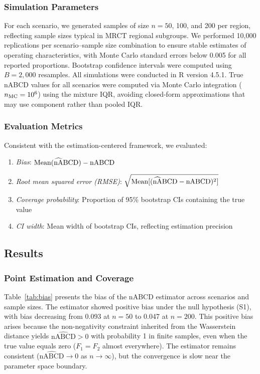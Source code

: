 \documentclass[AMA,Times1COL]{WileyNJDv5}
\newcommand{\hnABCD}{\mathrlap{\widehat{\phantom{\text{nA}}}}\text{nABCD}}
\begin{document}
\subsubsection{Simulation Parameters}

For each scenario, we generated samples of size $n = 50$, 100, and 200 per region, reflecting sample sizes typical in MRCT regional subgroups. We performed 10{,}000 replications per scenario--sample size combination to ensure stable estimates of operating characteristics, with Monte Carlo standard errors below 0.005 for all reported proportions. Bootstrap confidence intervals were computed using $B = 2{,}000$ resamples. All simulations were conducted in R version 4.5.1. True nABCD values for all scenarios were computed via Monte Carlo integration ($n_{\textup{MC}} = 10^6$) using the mixture IQR, avoiding closed-form approximations that may use component rather than pooled IQR.

\subsubsection{Evaluation Metrics}

Consistent with the estimation-centered framework, we evaluated:
\begin{enumerate}[1.]
\item \emph{Bias}: $\text{Mean}(\hnABCD) - \text{nABCD}$
\item \emph{Root mean squared error (RMSE)}: $\sqrt{\text{Mean}[(\hnABCD - \text{nABCD})^2]}$
\item \emph{Coverage probability}: Proportion of 95\% bootstrap CIs containing the true value
\item \emph{CI width}: Mean width of bootstrap CIs, reflecting estimation precision
\end{enumerate}

\subsection{Results}\label{sec:sim_results}

\subsubsection{Point Estimation and Coverage}

Table~\ref{tab:bias} presents the bias of the nABCD estimator across scenarios and sample sizes. The estimator showed positive bias under the null hypothesis (S1), with bias decreasing from 0.093 at $n=50$ to 0.047 at $n=200$. This positive bias arises because the non-negativity constraint inherited from the Wasserstein distance yields $\widehat{\text{nABCD}} > 0$ with probability 1 in finite samples, even when the true value equals zero ($F_1 = F_2$ almost everywhere). The estimator remains consistent ($\widehat{\text{nABCD}} \to 0$ as $n \to \infty$), but the convergence is slow near the parameter space boundary.
\end{document}
